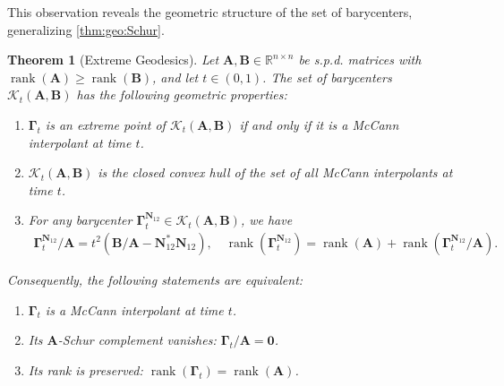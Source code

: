 \documentclass[noinfoline]{imsart}\setcounter{tocdepth}{2}
\renewcommand{\b}[1]{\mathbb{#1}} %
\newcommand{\m}[1]{\mathbf{#1}} %
\renewcommand{\c}[1]{\mathcal{#1}} %
\DeclareMathOperator*{\rk}{rank}
\theoremstyle{plain}
\newtheorem{theorem}{Theorem}[section]
\begin{document}
This observation reveals the geometric structure of the set of barycenters, generalizing \cref{thm:geo:Schur}.

\begin{theorem}[Extreme Geodesics]\label{thm:ext:geo}
Let $\m{A}, \m{B}  \in \b{R}^{n \times n}$ be s.p.d. matrices with $\rk(\m{A}) \geq \rk(\m{B})$, and let $t \in (0, 1)$. The set of barycenters $\c{K}_{t}(\m{A}, \m{B})$ has the following geometric properties:
\begin{enumerate}[leftmargin = *]
\item $\m{\Gamma}_{t}$ is an extreme point of $\c{K}_{t}(\m{A}, \m{B})$ if and only if it is a McCann interpolant at time $t$.
\item $\c{K}_{t}(\m{A}, \m{B})$ is the closed convex hull of the set of all McCann interpolants at time $t$.
\item For any barycenter $\m{\Gamma}_{t}^{\m{N}_{12}} \in \c{K}_{t}(\m{A}, \m{B})$, we have
\begin{align*}
    \m{\Gamma}_{t}^{\m{N}_{12}}/\m{A} = t^{2} (\m{B}/\m{A} - \m{N}_{12}^{*} \m{N}_{12}), \quad \rk(\m{\Gamma}_{t}^{\m{N}_{12}}) = \rk(\m{A}) + \rk (\m{\Gamma}_{t}^{\m{N}_{12}}/\m{A}).
\end{align*}
\end{enumerate}
Consequently, the following statements are equivalent:
\begin{enumerate}[leftmargin = *]
\item [a.] $\m{\Gamma}_{t}$ is a McCann interpolant at time $t$.
\item [b.] Its $\m{A}$-Schur complement vanishes: $\m{\Gamma}_{t}/\m{A} = \m{0}$.
\item [c.] Its rank is preserved: $\rk(\m{\Gamma}_{t}) = \rk(\m{A})$.
\end{enumerate}
\end{theorem}
\end{document}
